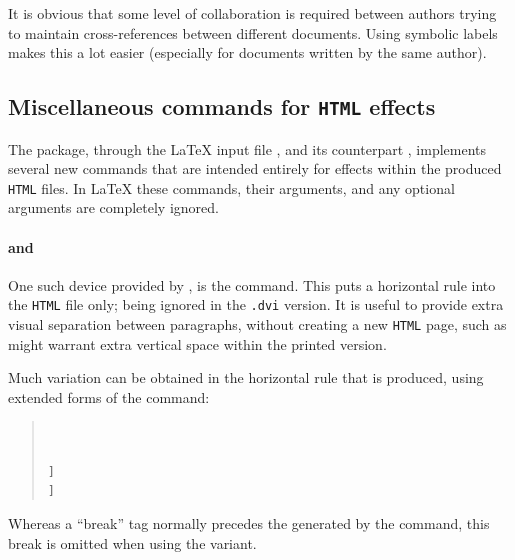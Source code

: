 %
It is obvious that some level of collaboration is required between
authors trying to maintain cross-references between different documents. 
Using symbolic labels makes this a lot easier 
(especially for documents written by the same author).



\subsection{Miscellaneous commands for \texttt{HTML} effects\label{misceffects}}%
\tableofchildlinks*
{}%

\noindent
The  package, through the \LaTeX{} input file ,
and its \Perl{} counterpart , implements several 
new commands that are intended entirely for effects within the
produced \texttt{HTML} files. In \LaTeX{} these commands, their arguments,
and any optional arguments are completely ignored.

%
%
\paragraph*{ and 
 \label{htmlrule}}
One such device provided by ,
is the  command. 
This puts a horizontal rule into the \texttt{HTML} file only;
being ignored in the \texttt{.dvi} version. 
It is useful to provide extra visual separation between paragraphs,
without creating a new \texttt{HTML} page, 
such as might warrant extra vertical space within the printed version.

%
%
%
Much variation can be obtained in the horizontal rule that is produced,
using extended forms of the  command:
\begin{quote}
\begin{small}
\\
\\
\Lc{htmlrule[}\texttt{]}\\
\Lc{htmlrule*[}\texttt{]}
\end{small}
\end{quote}
Whereas a ``break'' tag  normally precedes the  generated
by the  command, 
this break is omitted when using the  variant. 

